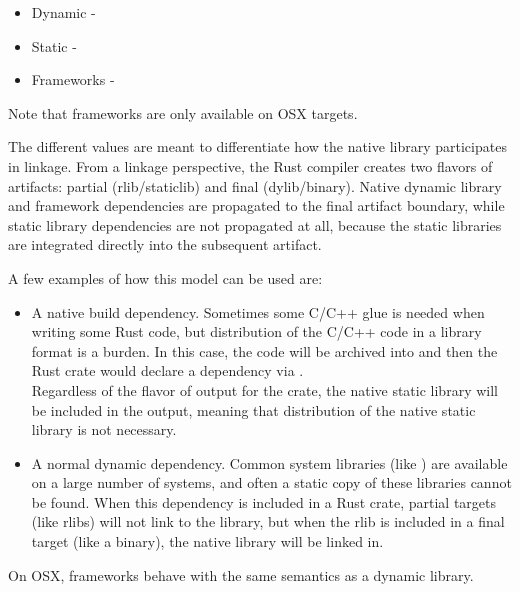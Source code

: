 \begin{itemize}
  \item{Dynamic - \code{\#[link(name = \enquote{readline})]}}
  \item{Static - \code{\#[link(name = \enquote{my\_build\_dependency}, kind = \enquote{static})]}}
  \item{Frameworks - \code{\#[link(name = \enquote{CoreFoundation}, kind = \enquote{framework})]}}
\end{itemize}

Note that frameworks are only available on OSX targets.

\blank

The different  values are meant to differentiate how the native library participates in linkage. From a 
linkage perspective, the Rust compiler creates two flavors of artifacts: partial (rlib/staticlib) and final (dylib/binary). 
Native dynamic library and framework dependencies are propagated to the final artifact boundary, while static library 
dependencies are not propagated at all, because the static libraries are integrated directly into the subsequent artifact.

\blank

A few examples of how this model can be used are:

\begin{itemize}
  \item{A native build dependency. Sometimes some C/C++ glue is needed when writing some Rust code, but distribution of 
      the C/C++ code in a library format is a burden. In this case, the code will be archived into  and 
      then the Rust crate would declare a dependency via \code{\#[link(name = "foo", kind = "static")]}. \\ Regardless of 
      the flavor of output for the crate, the native static library will be included in the output, meaning that distribution 
      of the native static library is not necessary.}
  \item{A normal dynamic dependency. Common system libraries (like ) are available on a large number of systems, 
      and often a static copy of these libraries cannot be found. When this dependency is included in a Rust crate, partial 
      targets (like rlibs) will not link to the library, but when the rlib is included in a final target (like a binary), the 
      native library will be linked in.}
\end{itemize}

On OSX, frameworks behave with the same semantics as a dynamic library.

